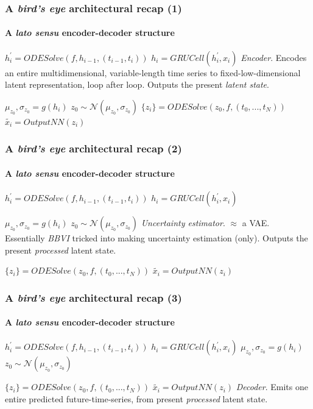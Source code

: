 \documentclass{beamer}
\begin{document}
\begin{frame}
	\frametitle{A \textit{bird's eye} architectural recap (1)}
	\framesubtitle{A \textit{lato sensu} encoder-decoder structure}
	\begin{block}{\center $h_{i}^{'}=ODESolve(f, h_{i-1}, (t_{i-1},t_{i}))$ \center $h_{i}=GRUCell(h_{i}^{'},x_{i})$}
		\centering
		\textit{Encoder}. Encodes an entire multidimensional, variable-length time series to fixed-low-dimensional latent representation, loop after loop. Outputs the present \textit{latent state}.
	\end{block}
	\center $\mu_{z_{0}}, \sigma_{z_{0}} =g(h_{i})$
	\center $z_{0} \sim \mathcal{N}(\mu_{z_{0}},\sigma_{z_{0}})$
	\center $\{z_{i}\}=ODESolve(z_{0}, f, (t_{0},...,t_{N}))$
	\center $\widetilde{x_{i}}=OutputNN(z_{i})$

\end{frame}
\begin{frame}
	\frametitle{A \textit{bird's eye} architectural recap (2)}
	\framesubtitle{A \textit{lato sensu} encoder-decoder structure}
	\center $h_{i}^{'}=ODESolve(f, h_{i-1}, (t_{i-1},t_{i}))$
	\center $h_{i}=GRUCell(h_{i}^{'},x_{i})$

	\begin{block}{\center $\mu_{z_{0}}, \sigma_{z_{0}} = g(h_{i})$ \center $z_{0} \sim \mathcal{N}(\mu_{z_{0}},\sigma_{z_{0}})$}
		\centering
		\textit{Uncertainty estimator}. $\approx$ a VAE. Essentially \textit{BBVI} tricked into making uncertainty estimation (only). Outputs the present \textit{processed} latent state.
	\end{block}

	\center $\{z_{i}\}=ODESolve(z_{0}, f, (t_{0},...,t_{N}))$
	\center $\widetilde{x_{i}}=OutputNN(z_{i})$

\end{frame}
\begin{frame}
	\frametitle{A \textit{bird's eye} architectural recap (3)}
	\framesubtitle{A \textit{lato sensu} encoder-decoder structure}
	\center $h_{i}^{'}=ODESolve(f, h_{i-1}, (t_{i-1},t_{i}))$
	\center $h_{i}=GRUCell(h_{i}^{'},x_{i})$
	\center $\mu_{z_{0}}, \sigma_{z_{0}} = g(h_{i})$
	\center $z_{0} \sim \mathcal{N}(\mu_{z_{0}},\sigma_{z_{0}})$

	\begin{block}{\center $\{z_{i}\}=ODESolve(z_{0}, f, (t_{0},...,t_{N}))$ \center $\widetilde{x_{i}}=OutputNN(z_{i})$}
	\centering
	\textit{Decoder}. Emits one entire predicted future-time-series, from present \textit{processed} latent state.
	\end{block}
\end{frame}
\end{document}
